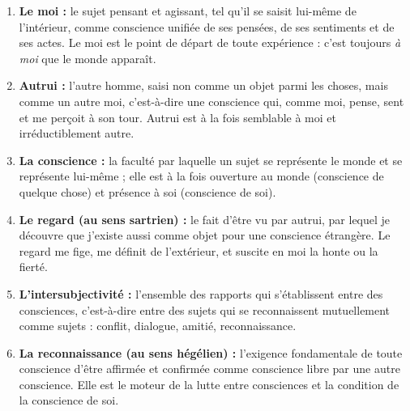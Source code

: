 \documentclass[11pt]{article}
\begin{document}
\begin{corrige}
\begin{enumerate}
\item \textbf{Le moi :} le sujet pensant et agissant, tel qu'il se saisit lui-même de l'intérieur, comme conscience unifiée de ses pensées, de ses sentiments et de ses actes. Le moi est le point de départ de toute expérience : c'est toujours \emph{à moi} que le monde apparaît.
\item \textbf{Autrui :} l'autre homme, saisi non comme un objet parmi les choses, mais comme un autre moi, c'est-à-dire une conscience qui, comme moi, pense, sent et me perçoit à son tour. Autrui est à la fois semblable à moi et irréductiblement autre.
\item \textbf{La conscience :} la faculté par laquelle un sujet se représente le monde et se représente lui-même ; elle est à la fois ouverture au monde (conscience de quelque chose) et présence à soi (conscience de soi).
\item \textbf{Le regard (au sens sartrien) :} le fait d'être vu par autrui, par lequel je découvre que j'existe aussi comme objet pour une conscience étrangère. Le regard me fige, me définit de l'extérieur, et suscite en moi la honte ou la fierté.
\item \textbf{L'intersubjectivité :} l'ensemble des rapports qui s'établissent entre des consciences, c'est-à-dire entre des sujets qui se reconnaissent mutuellement comme sujets : conflit, dialogue, amitié, reconnaissance.
\item \textbf{La reconnaissance (au sens hégélien) :} l'exigence fondamentale de toute conscience d'être affirmée et confirmée comme conscience libre par une autre conscience. Elle est le moteur de la lutte entre consciences et la condition de la conscience de soi.
\end{enumerate}
\end{corrige}
\end{document}
